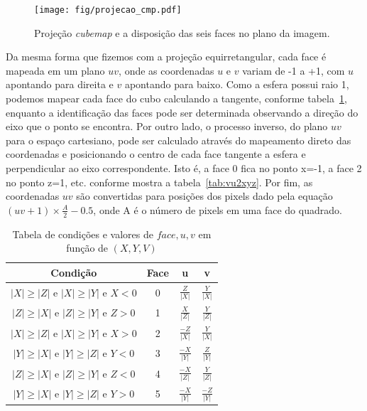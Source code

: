 \begin{figure}[h]
	\centering
	\texttt{[image: fig/projecao\_cmp.pdf]}
	\caption{Projeção \textit{cubemap} e a disposição das seis faces no plano da imagem.}
	\label{fig:cmp}
\end{figure}

Da mesma forma que fizemos com a projeção equirretangular, cada face é mapeada em um plano $uv$, onde as coordenadas $u$ e $v$ variam de -1 a +1, com $u$ apontando para direita e $v$ apontando para baixo. Como a esfera possui raio 1, podemos mapear cada face do cubo calculando a tangente, conforme tabela~\ref{tab:xyz2vu}, enquanto a identificação das faces pode ser determinada observando a direção do eixo que o ponto se encontra.
Por outro lado, o processo inverso, do plano $uv$ para o espaço cartesiano, pode ser calculado através do mapeamento direto das coordenadas e posicionando o centro de cada face tangente a esfera e perpendicular ao eixo correspondente. Isto é, a face 0 fica no ponto x=-1, a face 2 no ponto z=1, etc. conforme
mostra a tabela~\ref{tab:vu2xyz}. Por fim, as coordenadas $uv$ são convertidas para posições dos pixels dado pela equação $ (uv+1)\times \frac{A}{2}-0.5$, onde A é o número de pixels em uma face do quadrado.

\begin{table}[htb]
	\centering
	\caption{Tabela de condições e valores de \( face, u, v \) em função de $(X, Y, V)$}
	\label{tab:xyz2vu}
	\begin{tabular}{|c|c|c|c|}
		\hline
		\textbf{Condição} & \textbf{Face} & \textbf{u} & \textbf{v} \\
		\hline
		$ |X| \geq |Z|  \text{ e }  |X| \geq |Y|  \text{ e }  X < 0 $ & 0 &  $\frac{Z}{|X|}$ & $ \frac{Y}{|X|} $ \\
		$ |Z| \geq |X|  \text{ e }  |Z| \geq |Y|  \text{ e }  Z > 0 $ & 1 &  $\frac{X}{|Z|}$ & $ \frac{Y}{|Z|} $ \\
		$ |X| \geq |Z|  \text{ e }  |X| \geq |Y|  \text{ e }  X > 0 $ & 2 &  $\frac{-Z}{|X|}$  & $ \frac{Y}{|X|} $ \\
		$ |Y| \geq |X|  \text{ e }  |Y| \geq |Z|  \text{ e }  Y < 0 $ & 3 &  $\frac{-X}{|Y|} $ & $ \frac{Z}{|Y|} $ \\
		$ |Z| \geq |X|  \text{ e }  |Z| \geq |Y|  \text{ e }  Z < 0 $ & 4 &  $\frac{-X}{|Z|}$  & $ \frac{Y}{|Z|} $ \\
		$ |Y| \geq |X|  \text{ e }  |Y| \geq |Z|  \text{ e }  Y > 0 $ & 5 &  $\frac{-X}{|Y|}$  & $ \frac{-Z}{|Y|} $ \\
		\hline
	\end{tabular}
\end{table}



